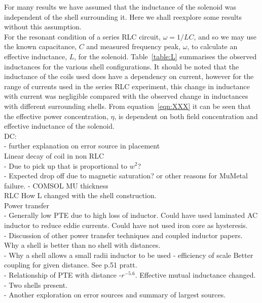 \documentclass[11pt]{iopart}
\begin{document}
For many results we have assumed that the inductance of the solenoid
was independent of the shell surrounding it. Here we shall reexplore
some results without this assumption. \\ For the resonant condition of
a series RLC circuit, $\omega = 1/LC$, and so we may use the known
capacitance, $C$ and measured frequency peak, $\omega$, to calculate
an effective inductance, $L$, for the solenoid. Table~\ref{table:L}
summarises the observed inductances for the various shell
configurations. It should be noted that the inductance of the coils
used does have a dependency on current, however for the range of
currents used in the series RLC experiment, this change in inductance
with current was negligible compared with the observed change in
inductances with different surrounding shells. From
equation~\ref{eqn:XXX} it can be seen that the effective power
concentration, $\eta$, is dependent on both field concentration and
effective inductance of the solenoid. \\


DC:  \\
- further explanation on error source in placement \\

Linear decay of coil in non RLC \\
- Due to pick up that is proportional to $w^2$? \\
- Expected drop off due to magnetic saturation? or other reasons for
MuMetal failure. - COMSOL MU thickness \\

RLC How L changed with the shell construction. \\

Power transfer \\
- Generally low PTE due to high loss of inductor.  Could have used
laminated AC inductor to reduce eddie currents.  Could have not used
iron core as hysteresis. \\
- Discussion of other power transfer techniques and coupled inductor
papers. Why a shell is better than no shell with distances. \\
- Why a shell allows a small radii inductor to be used - efficiency of scale
Better coupling for given distance. See p.51 pratt. \\
- Relationship of PTE with distance -$r^{-5.6}$. Effective mutual
inductance changed. \\
- Two shells present. \\
- Another exploration on error sources and summary of largest
sources.\\
\end{document}
